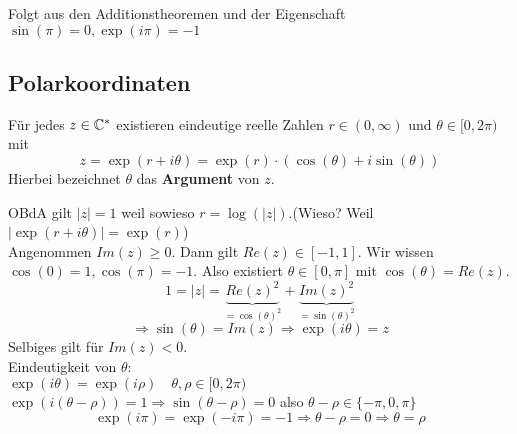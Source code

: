 \documentclass[main.tex]{subfiles}
\begin{document}
\begin{Beweis}
  Folgt aus den Additionstheoremen und der Eigenschaft $\sin(\pi) = 0,  \exp(i \pi) = -1$
\end{Beweis}


\subsection{Polarkoordinaten}

\begin{Theorem}
  Für jedes $z \in \mathbb{C}^*$ existieren eindeutige reelle Zahlen $r \in (0, \infty)$ und $\theta \in [0,2\pi)$ mit
  $$z = \exp(r + i \theta) = \exp(r)\cdot (\cos(\theta) + i \sin(\theta))$$
  Hierbei bezeichnet $\theta$ das \textbf{Argument} von $z$.
\end{Theorem}

\begin{Beweis}
  OBdA gilt $|z| = 1$ weil sowieso $r = \log(|z|)$.(Wieso? Weil $|\exp(r + i \theta)| = \exp(r)$)\\
  Angenommen $Im(z) \geq 0$. Dann gilt $Re(z) \in [-1,1]$. Wir wissen $\cos(0) = 1, \cos(\pi) = -1$. Also existiert $\theta \in [0,\pi]$ mit $\cos(\theta) = Re(z)$.\\
  $$1 = |z| = \underbrace{Re(z)^2}_{=\cos(\theta)^2} + \underbrace{Im(z)^2}_{=\sin(\theta)^2}$$
  $$\Rightarrow \sin(\theta) = Im(z) \Rightarrow \exp(i \theta) = z$$
  Selbiges gilt für $Im(z) < 0$.\\
  Eindeutigkeit von $\theta$:\\
  $\exp(i \theta) = \exp(i \rho) \quad \theta,\rho \in [0,2\pi)$\\
  $\exp(i(\theta - \rho)) = 1 \Rightarrow \sin(\theta - \rho) = 0$ also $\theta - \rho \in \{-\pi,0,\pi\}$\\
  $$\exp(i \pi) = \exp(-i \pi) = -1 \Rightarrow \theta - \rho = 0 \Rightarrow \theta = \rho$$
\end{Beweis}
\end{document}
